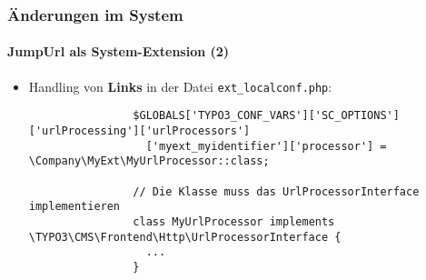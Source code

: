 \begin{frame}[fragile]
	\frametitle{Änderungen im System}
	\framesubtitle{JumpUrl als System-Extension (2)}

	\lstset{basicstyle=\tiny\ttfamily}

	\begin{itemize}

		\item Handling von \textbf{Links} in der Datei \texttt{ext\_localconf.php}:
			\normalsize

			\begin{lstlisting}
				$GLOBALS['TYPO3_CONF_VARS']['SC_OPTIONS']['urlProcessing']['urlProcessors']
				  ['myext_myidentifier']['processor'] = \Company\MyExt\MyUrlProcessor::class;

				// Die Klasse muss das UrlProcessorInterface implementieren
				class MyUrlProcessor implements \TYPO3\CMS\Frontend\Http\UrlProcessorInterface {
				  ...
				}
			\end{lstlisting}

	\end{itemize}

	\breakingchange

\end{frame}

